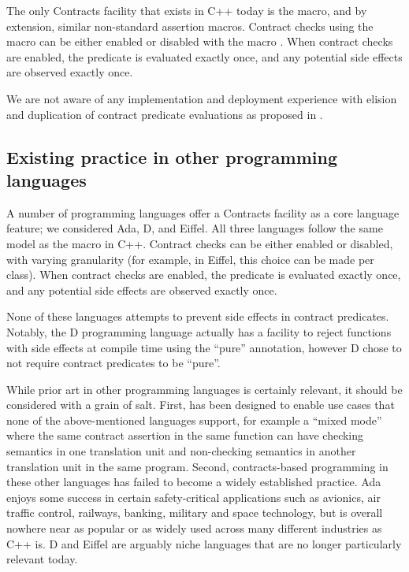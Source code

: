 The only Contracts facility that exists in C++ today is the  macro, and by extension, similar non-standard assertion macros. Contract checks using the  macro can be either enabled or disabled with the macro . When contract checks are enabled, the predicate is evaluated exactly once, and any potential side effects are observed exactly once.

We are not aware of any implementation and deployment experience with elision and duplication of  contract predicate evaluations as proposed in \cite{P2900R6}.

\subsection{Existing practice in other programming languages}

A number of programming languages offer a Contracts facility as a core language feature; we considered Ada, D, and Eiffel. All three languages follow the same model as the  macro in C++. Contract checks can be either enabled or disabled, with varying granularity (for example, in Eiffel, this choice can be made per class). When contract checks are enabled, the predicate is evaluated exactly once, and any potential side effects are observed exactly once. 

None of these languages attempts to prevent side effects in contract predicates. Notably, the D programming language actually has a facility to reject functions with side effects at compile time using the ``pure'' annotation, however D chose to not require contract predicates to be ``pure''. 

While prior art in other programming languages is certainly relevant, it should be considered with a grain of salt. First, \cite{P2900R6} has been designed to enable use cases that none of the above-mentioned languages support, for example a ``mixed mode'' where the same contract assertion in the same function can have checking semantics in one translation unit and non-checking semantics in another translation unit in the same program. Second, contracts-based programming in these other languages has failed to become a widely established practice. Ada enjoys some success in certain safety-critical applications such as avionics, air traffic control, railways, banking, military and space technology, but is overall nowhere near as popular or as widely used across many different industries as C++ is. D and Eiffel are arguably niche languages that are no longer particularly relevant today.

